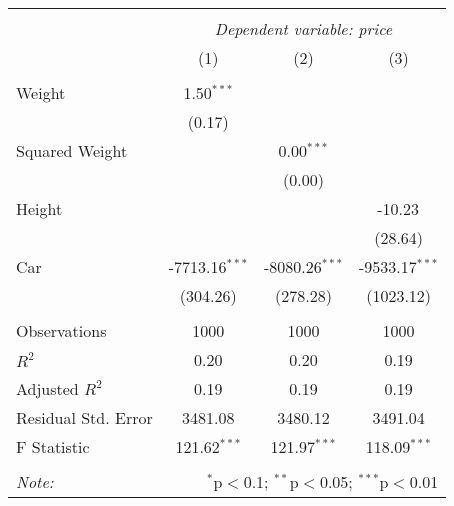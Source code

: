 
\begin{tabular}{@{\extracolsep{5pt}}lccc}
\\[-1.8ex]\hline
\hline \\[-1.8ex]
& \multicolumn{3}{c}{\textit{Dependent variable: price}} \
\cr \cline{2-4}
\\[-1.8ex] & (1) & (2) & (3) \\
\hline \\[-1.8ex]
 Weight & 1.50$^{***}$ & & \\
& (0.17) & & \\
 Squared Weight & & 0.00$^{***}$ & \\
& & (0.00) & \\
 Height & & & -10.23$^{}$ \\
& & & (28.64) \\
 Car & -7713.16$^{***}$ & -8080.26$^{***}$ & -9533.17$^{***}$ \\
& (304.26) & (278.28) & (1023.12) \\
\hline \\[-1.8ex]
 Observations & 1000 & 1000 & 1000 \\
 $R^2$ & 0.20 & 0.20 & 0.19 \\
 Adjusted $R^2$ & 0.19 & 0.19 & 0.19 \\
 Residual Std. Error & 3481.08 & 3480.12 & 3491.04 \\
 F Statistic & 121.62$^{***}$ & 121.97$^{***}$ & 118.09$^{***}$ \\
\hline
\hline \\[-1.8ex]
\textit{Note:} & \multicolumn{3}{r}{$^{*}$p$<$0.1; $^{**}$p$<$0.05; $^{***}$p$<$0.01} \\
\end{tabular}
